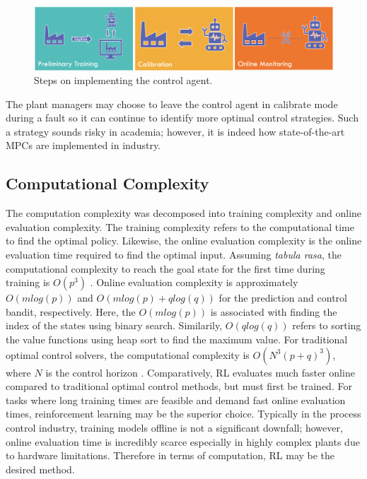 \begin{figure}[H]
    \centering
    \includegraphics[width=12cm]{images/ftc/rl_implementation.png}
    \caption{Steps on implementing the control agent.}
    \label{fig:08RL_implementation}
\end{figure}

The plant managers may choose to leave the control agent in calibrate mode during a fault so it can continue to identify more optimal control strategies.  Such a strategy sounds risky in academia; however, it is indeed how state-of-the-art MPCs are implemented in industry.

\subsection{Computational Complexity}
The computation complexity was decomposed into training complexity and online evaluation complexity.  The training complexity refers to the computational time to find the optimal policy.  Likewise, the online evaluation complexity is the online evaluation time required to find the optimal input.  Assuming \textit{tabula rasa}, the computational complexity to reach the goal state for the first time during training is $O(p^3)$ \cite{complexity_rl_ref19}. Online evaluation complexity is approximately $O(mlog(p))$ and $O(mlog(p) + qlog(q))$ for the prediction and control bandit, respectively. Here, the $O(mlog(p))$ is associated with finding the index of the states using binary search.  Similarily, $O(qlog(q))$ refers to sorting the value functions using heap sort to find the maximum value. For traditional optimal control solvers, the computational complexity is $O(N^3(p + q)^3)$, where $N$ is the control horizon \cite{mpc_comp_time}. Comparatively, RL evaluates much faster online compared to traditional optimal control methods, but must first be trained. For tasks where long training times are feasible and demand fast online evaluation times, reinforcement learning may be the superior choice.  Typically in the process control industry, training models offline is not a significant downfall; however, online evaluation time is incredibly scarce especially in highly complex plants due to hardware limitations.  Therefore in terms of computation, RL may be the desired method.

